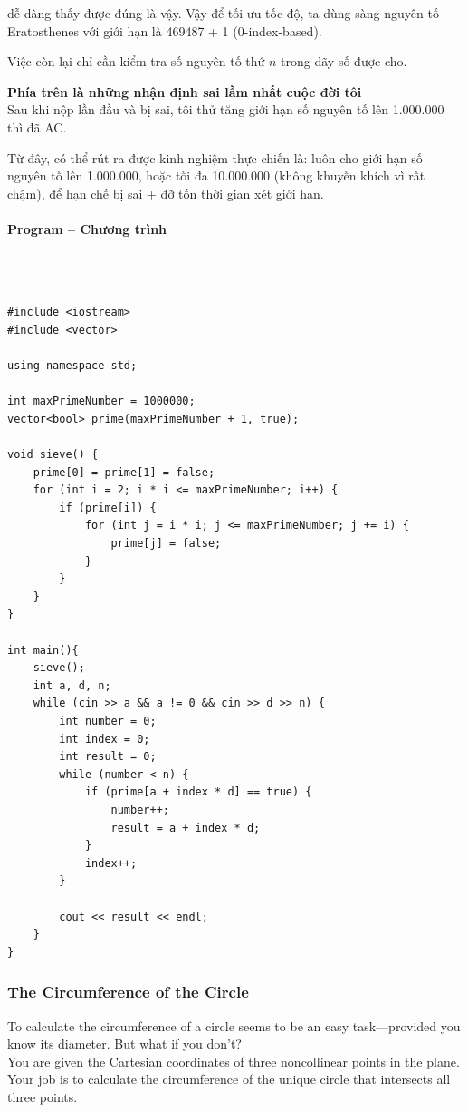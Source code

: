 \documentclass{article}
\begin{document}
dễ dàng thấy được đúng là vậy. Vậy để tối ưu tốc độ, ta dùng sàng nguyên tố Eratosthenes với giới hạn là 469487 + 1 (0-index-based).

Việc còn lại chỉ cần kiểm tra số nguyên tố thứ $n$ trong dãy số được cho.


\textbf{Phía trên là những nhận định sai lầm nhất cuộc đời tôi}\\

Sau khi nộp lần đầu và bị sai, tôi thử tăng giới hạn số nguyên tố lên 1.000.000 thì đã AC.

Từ đây, có thể rút ra được kinh nghiệm thực chiến là: luôn cho giới hạn số nguyên tố lên 1.000.000, hoặc tối đa 10.000.000 (không khuyến khích vì rất chậm), để hạn chế bị sai + đỡ tốn thời gian xét giới hạn.
\paragraph{Program -- Chương trình} \mbox{} \\


\begin{lstlisting}

#include <iostream>
#include <vector>

using namespace std;
	
int maxPrimeNumber = 1000000;
vector<bool> prime(maxPrimeNumber + 1, true);

void sieve() {
	prime[0] = prime[1] = false;
	for (int i = 2; i * i <= maxPrimeNumber; i++) {
		if (prime[i]) {
			for (int j = i * i; j <= maxPrimeNumber; j += i) {
				prime[j] = false;
			}
		}
	}
}

int main(){
	sieve();
	int a, d, n; 
	while (cin >> a && a != 0 && cin >> d >> n) {
		int number = 0;
		int index = 0;
		int result = 0;
		while (number < n) {
			if (prime[a + index * d] == true) {
				number++;
				result = a + index * d;
			}
			index++;
		}
		
		cout << result << endl;
	}
}
\end{lstlisting}


\subsubsection{The Circumference of the Circle}

To calculate the circumference of a circle seems to be an easy task—provided you know its diameter. But what if you don’t? \\
You are given the Cartesian coordinates of three noncollinear points in the plane. \\
Your job is to calculate the circumference of the unique circle that intersects all three
points.
\end{document}
